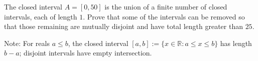 The closed interval $A = [0, 50]$ is the union of a finite number of closed intervals, each of length $1$. Prove that some of the intervals can be removed so that those remaining are mutually disjoint and have total length greater than $25$.

Note: For reals $a\le b$,  the closed interval $[a, b] := \{x\in \mathbb{R}:a\le x\le b\}$ has length $b-a$; disjoint intervals have empty intersection.